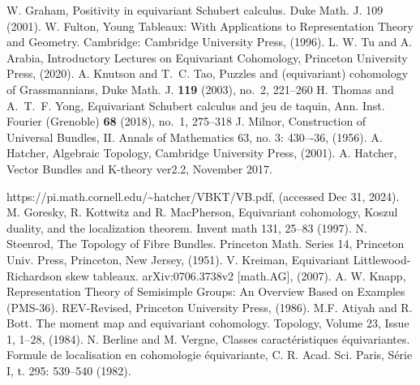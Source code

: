 \begin{thebibliography}{99}
  
   W. Graham, Positivity in equivariant Schubert calculus. Duke Math. J. 109 (2001).
   W. Fulton, Young Tableaux: With Applications to Representation Theory and Geometry. Cambridge: Cambridge University Press, (1996).
   L. W. Tu and A. Arabia, Introductory Lectures on Equivariant Cohomology, Princeton University Press, (2020).
   A. Knutson and T.~C. Tao, Puzzles and (equivariant) cohomology of Grassmannians, Duke Math. J. {\bf 119} (2003), no.~2, 221--260 
   H. Thomas and A.~T.~F. Yong, Equivariant Schubert calculus and jeu de taquin, Ann. Inst. Fourier (Grenoble) {\bf 68} (2018), no.~1, 275--318
   J. Milnor, Construction of Universal Bundles, II. Annals of Mathematics 63, no. 3: 430–-36, (1956).
   A. Hatcher, Algebraic Topology, Cambridge University Press, (2001).
   A. Hatcher, Vector Bundles and K-theory ver2.2, November 2017. 
  
  https://pi.math.cornell.edu/\textasciitilde hatcher/VBKT/VB.pdf, (accessed Dec 31, 2024).
   M. Goresky, R. Kottwitz and R. MacPherson, Equivariant cohomology, Koszul duality, and the localization theorem. Invent math 131, 25--83 (1997).
   N. Steenrod, The Topology of Fibre Bundles. Princeton Math. Series 14,
  Princeton Univ. Press, Princeton, New Jersey, (1951).
   V. Kreiman, Equivariant Littlewood-Richardson skew tableaux. arXiv:0706.3738v2 [math.AG], (2007).
   A. W. Knapp, Representation Theory of Semisimple Groups: An Overview Based on Examples (PMS-36). REV-Revised, Princeton University Press, (1986). 
   M.F. Atiyah and R. Bott.
  The moment map and equivariant cohomology.
  Topology,
  Volume 23, Issue 1, 1--28, (1984).
   N. Berline and M. Vergne, Classes caract\'eristiques \'equivariantes. Formule
  de localisation en cohomologie \'equivariante, C. R. Acad. Sci. Paris, S\'erie
  I, t. 295: 539--540 (1982).

\end{thebibliography}